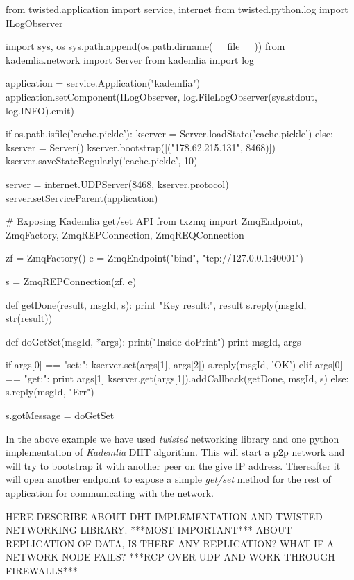 \begin{python}
from twisted.application import service, internet
from twisted.python.log import ILogObserver

import sys, os
sys.path.append(os.path.dirname(__file__))
from kademlia.network import Server
from kademlia import log

application = service.Application("kademlia")
application.setComponent(ILogObserver, 
	log.FileLogObserver(sys.stdout, log.INFO).emit)

if os.path.isfile('cache.pickle'):
    kserver = Server.loadState('cache.pickle')
else:
    kserver = Server()
    kserver.bootstrap([("178.62.215.131", 8468)])
kserver.saveStateRegularly('cache.pickle', 10)

server = internet.UDPServer(8468, kserver.protocol)
server.setServiceParent(application)


# Exposing Kademlia get/set API
from txzmq import ZmqEndpoint, ZmqFactory, ZmqREPConnection,
 ZmqREQConnection

zf = ZmqFactory()
e = ZmqEndpoint("bind", "tcp://127.0.0.1:40001")

s = ZmqREPConnection(zf, e)

def getDone(result, msgId, s):
    print "Key result:", result
    s.reply(msgId, str(result))

def doGetSet(msgId, *args):
    print("Inside doPrint")
    print msgId, args

    if args[0] == "set:":
        kserver.set(args[1], args[2])
        s.reply(msgId, 'OK')
    elif args[0] == "get:":
        print args[1]
        kserver.get(args[1]).addCallback(getDone, msgId, s)
    else:
        s.reply(msgId, "Err")

s.gotMessage = doGetSet
\end{python}

In the above example we have used \textit{twisted} networking library\cite{TwistedMatrix} and one python implementation\cite{KademliaImpl} of \textit{Kademlia} DHT algorithm\cite{KademliaPaper}. This will start a p2p network and will try to bootstrap it with another peer on the give IP address. Thereafter it will open another endpoint to expose a simple \textit{get/set} method for the rest of application for communicating with the network.

HERE DESCRIBE ABOUT DHT IMPLEMENTATION AND TWISTED NETWORKING LIBRARY. ***MOST IMPORTANT*** ABOUT REPLICATION OF DATA, IS THERE ANY REPLICATION? WHAT IF A NETWORK NODE FAILS? ***RCP OVER UDP AND WORK THROUGH FIREWALLS***

